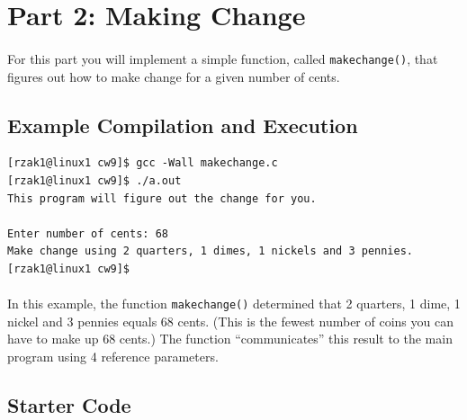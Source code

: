 \documentclass[letter,11pt]{article}
\begin{document}
\section*{Part 2: Making Change}
\paragraph{}For this part you will implement a simple function, called \texttt{makechange()}, that figures out how to make change for a given number of cents.

\subsection*{Example Compilation and Execution}
\begin{verbatim}
[rzak1@linux1 cw9]$ gcc -Wall makechange.c
[rzak1@linux1 cw9]$ ./a.out
This program will figure out the change for you.

Enter number of cents: 68
Make change using 2 quarters, 1 dimes, 1 nickels and 3 pennies.
[rzak1@linux1 cw9]$
\end{verbatim}

\paragraph{}In this example, the function \texttt{makechange()} determined that 2 quarters, 1 dime, 1 nickel and 3 pennies equals 68 cents. (This is the fewest number of coins you can have to make up 68 cents.) The function ``communicates'' this result to the main program using 4 reference parameters.

\subsection*{Starter Code}
\end{document}
